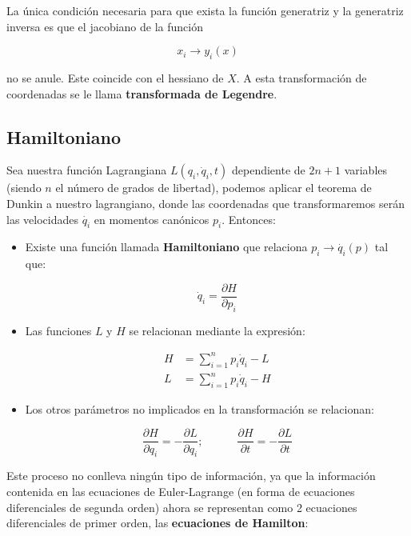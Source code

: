 \documentclass[12pt,a4paper]{book}
\newcommand{\parciales}[2]{\frac{\partial #1}{\partial #2}}
\newcommand{\tquad}{\quad \quad \quad}
\begin{document}
La única condición necesaria para que exista la función generatriz y la generatriz inversa es que el jacobiano de la función

$$ x_i \rightarrow y_i (x) $$ 

no se anule. Este coincide con el hessiano de $X$. A esta transformación de coordenadas se le llama \textbf{transformada de Legendre}.


\subsection{Hamiltoniano}

Sea nuestra función Lagrangiana $L(q_i,\dot{q}_i,t)$ dependiente de $2n+1$ variables (siendo $n$ el número de grados de libertad), podemos aplicar el teorema de Dunkin a nuestro lagrangiano, donde las coordenadas que transformaremos serán las velocidades $\dot{q_i}$ en momentos canónicos $p_i$. Entonces:

\begin{itemize}
\item Existe una función llamada \textbf{Hamiltoniano} que relaciona $p_i \rightarrow \dot{q_i} (p)$ tal que:

\begin{equation}
\dot{q}_i = \parciales{H}{p_i}
\end{equation}

\item Las funciones $L$ y $H$ se relacionan mediante la expresión:

\begin{align}
H & = \sum_{i=1}^n  p_i \dot{q}_i - L \\
L & = \sum_{i=1}^n  p_i \dot{q}_i - H
\end{align}

\item Los otros parámetros no implicados en la transformación se relacionan:

\begin{equation}
\parciales{H}{q_i} =  - \parciales{L}{q_i}; \tquad \parciales{H}{t} =  - \parciales{L}{t}
\end{equation}
\end{itemize}

Este proceso no conlleva ningún tipo de información, ya que la información contenida en las ecuaciones de Euler-Lagrange (en forma de ecuaciones diferenciales de segunda orden) ahora se representan como 2 ecuaciones diferenciales de primer orden, las \textbf{ecuaciones de Hamilton}:
\end{document}
